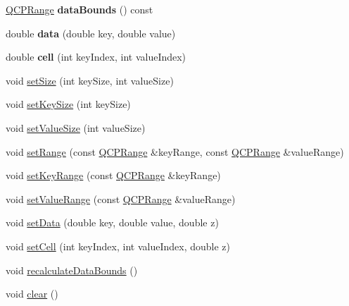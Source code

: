 \begin{DoxyCompactItemize}
\item 
\mbox{\label{class_q_c_p_color_map_data_ab7620248272c5ddd9a3f877f07179f6d}} 
\hyperlink{class_q_c_p_range}{Q\+C\+P\+Range} {\bfseries data\+Bounds} () const
\item 
\mbox{\label{class_q_c_p_color_map_data_a2c33807b008cdb9e1394245c294c0eaf}} 
double {\bfseries data} (double key, double value)
\item 
\mbox{\label{class_q_c_p_color_map_data_af51ecd21f347adbf87b4cce4e1f5cbd6}} 
double {\bfseries cell} (int key\+Index, int value\+Index)
\item 
void \hyperlink{class_q_c_p_color_map_data_a0d9ff35c299d0478b682bfbcdd9c097e}{set\+Size} (int key\+Size, int value\+Size)
\item 
void \hyperlink{class_q_c_p_color_map_data_ac7ef70e383aface34b44dbde49234b6b}{set\+Key\+Size} (int key\+Size)
\item 
void \hyperlink{class_q_c_p_color_map_data_a0893c9e3914513048b45e3429ffd16f2}{set\+Value\+Size} (int value\+Size)
\item 
void \hyperlink{class_q_c_p_color_map_data_aad9c1c7c703c1339489fc730517c83d4}{set\+Range} (const \hyperlink{class_q_c_p_range}{Q\+C\+P\+Range} \&key\+Range, const \hyperlink{class_q_c_p_range}{Q\+C\+P\+Range} \&value\+Range)
\item 
void \hyperlink{class_q_c_p_color_map_data_a0738c485f3c9df9ea1241b7a8bb6a86e}{set\+Key\+Range} (const \hyperlink{class_q_c_p_range}{Q\+C\+P\+Range} \&key\+Range)
\item 
void \hyperlink{class_q_c_p_color_map_data_ada1b2680ba96a5f4175b6d341cf75d23}{set\+Value\+Range} (const \hyperlink{class_q_c_p_range}{Q\+C\+P\+Range} \&value\+Range)
\item 
void \hyperlink{class_q_c_p_color_map_data_afd2083ccfd6987ec94aa7ef8e91ca39a}{set\+Data} (double key, double value, double z)
\item 
void \hyperlink{class_q_c_p_color_map_data_a8e75eaf8746596319032a93f3d2d0683}{set\+Cell} (int key\+Index, int value\+Index, double z)
\item 
void \hyperlink{class_q_c_p_color_map_data_ab235ade8a4d64bd3adb26a99b3dd57ee}{recalculate\+Data\+Bounds} ()
\item 
void \hyperlink{class_q_c_p_color_map_data_a9910ba830e96955bd5c8e5bef1e77ef3}{clear} ()

\end{DoxyCompactItemize}
